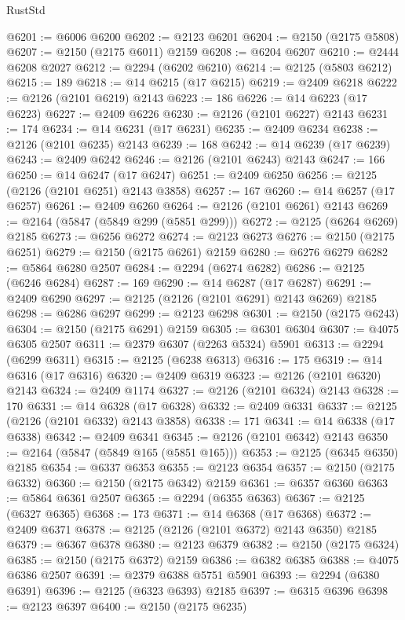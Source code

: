 \begin{lexlean}{RustStd}
\begin{coremodule}
@6201 := @6006 @6200
@6202 := @2123 @6201
@6204 := @2150 (@2175 @5808)
@6207 := @2150 (@2175 @6011) @2159
@6208 := @6204 @6207
@6210 := @2444 @6208 @2027
@6212 := @2294 (@6202 @6210)
@6214 := @2125 (@5803 @6212)
@6215 := 189
@6218 := @14 @6215 (@17 @6215)
@6219 := @2409 @6218
@6222 := @2126 (@2101 @6219) @2143
@6223 := 186
@6226 := @14 @6223 (@17 @6223)
@6227 := @2409 @6226
@6230 := @2126 (@2101 @6227) @2143
@6231 := 174
@6234 := @14 @6231 (@17 @6231)
@6235 := @2409 @6234
@6238 := @2126 (@2101 @6235) @2143
@6239 := 168
@6242 := @14 @6239 (@17 @6239)
@6243 := @2409 @6242
@6246 := @2126 (@2101 @6243) @2143
@6247 := 166
@6250 := @14 @6247 (@17 @6247)
@6251 := @2409 @6250
@6256 := @2125 (@2126 (@2101 @6251) @2143 @3858)
@6257 := 167
@6260 := @14 @6257 (@17 @6257)
@6261 := @2409 @6260
@6264 := @2126 (@2101 @6261) @2143
@6269 := @2164 (@5847 (@5849 @299 (@5851 @299)))
@6272 := @2125 (@6264 @6269) @2185
@6273 := @6256 @6272
@6274 := @2123 @6273
@6276 := @2150 (@2175 @6251)
@6279 := @2150 (@2175 @6261) @2159
@6280 := @6276 @6279
@6282 := @5864 @6280 @2507
@6284 := @2294 (@6274 @6282)
@6286 := @2125 (@6246 @6284)
@6287 := 169
@6290 := @14 @6287 (@17 @6287)
@6291 := @2409 @6290
@6297 := @2125 (@2126 (@2101 @6291) @2143 @6269) @2185
@6298 := @6286 @6297
@6299 := @2123 @6298
@6301 := @2150 (@2175 @6243)
@6304 := @2150 (@2175 @6291) @2159
@6305 := @6301 @6304
@6307 := @4075 @6305 @2507
@6311 := @2379 @6307 (@2263 @5324) @5901
@6313 := @2294 (@6299 @6311)
@6315 := @2125 (@6238 @6313)
@6316 := 175
@6319 := @14 @6316 (@17 @6316)
@6320 := @2409 @6319
@6323 := @2126 (@2101 @6320) @2143
@6324 := @2409 @1174
@6327 := @2126 (@2101 @6324) @2143
@6328 := 170
@6331 := @14 @6328 (@17 @6328)
@6332 := @2409 @6331
@6337 := @2125 (@2126 (@2101 @6332) @2143 @3858)
@6338 := 171
@6341 := @14 @6338 (@17 @6338)
@6342 := @2409 @6341
@6345 := @2126 (@2101 @6342) @2143
@6350 := @2164 (@5847 (@5849 @165 (@5851 @165)))
@6353 := @2125 (@6345 @6350) @2185
@6354 := @6337 @6353
@6355 := @2123 @6354
@6357 := @2150 (@2175 @6332)
@6360 := @2150 (@2175 @6342) @2159
@6361 := @6357 @6360
@6363 := @5864 @6361 @2507
@6365 := @2294 (@6355 @6363)
@6367 := @2125 (@6327 @6365)
@6368 := 173
@6371 := @14 @6368 (@17 @6368)
@6372 := @2409 @6371
@6378 := @2125 (@2126 (@2101 @6372) @2143 @6350) @2185
@6379 := @6367 @6378
@6380 := @2123 @6379
@6382 := @2150 (@2175 @6324)
@6385 := @2150 (@2175 @6372) @2159
@6386 := @6382 @6385
@6388 := @4075 @6386 @2507
@6391 := @2379 @6388 @5751 @5901
@6393 := @2294 (@6380 @6391)
@6396 := @2125 (@6323 @6393) @2185
@6397 := @6315 @6396
@6398 := @2123 @6397
@6400 := @2150 (@2175 @6235)

\end{coremodule}
\end{lexlean}

